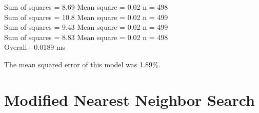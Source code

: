 \documentclass{article}
\begin{document}
Sum of squares = 8.69    Mean square = 0.02    n = 498\\ 
Sum of squares = 10.8    Mean square = 0.02    n = 499\\ 
Sum of squares = 9.43    Mean square = 0.02    n = 499\\ 
Sum of squares = 8.83    Mean square = 0.02    n = 498\\ 

Overall - 0.0189 ms 

The mean squared error of this model was 1.89\%.


\section{Modified Nearest Neighbor Search}
\end{document}
